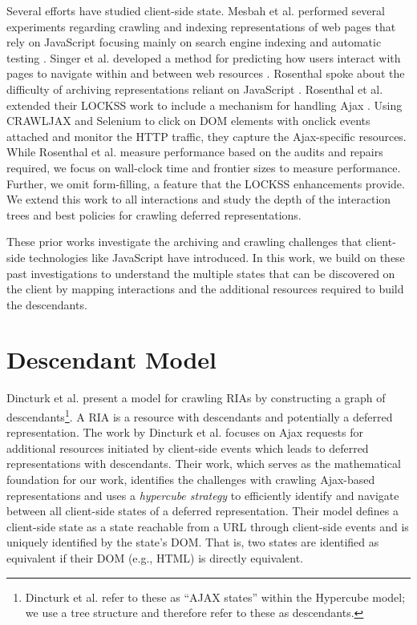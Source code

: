 \documentclass{sig-alternate}
\begin{document}
Several efforts have studied client-side state. Mesbah et al. performed several experiments regarding crawling and indexing representations of web pages that rely on JavaScript \cite{mesbahCrawling, mesbahInferState} focusing mainly on search engine indexing and automatic testing \cite{mesbahTesting, mesbah2}. Singer et al. developed a method for predicting how users interact with pages to navigate within and between web resources \cite{hyptrails}. Rosenthal spoke about the difficulty of archiving representations reliant on JavaScript \cite{iipc2013, futureWeb}. Rosenthal et al. extended their LOCKSS work to include a mechanism for handling Ajax \cite{dshrDlib}. Using CRAWLJAX and Selenium to click on DOM elements with onclick events attached and monitor the HTTP traffic, they capture the Ajax-specific resources. While Rosenthal et al. measure performance based on the audits and repairs required, we focus on wall-clock time and frontier sizes to measure performance. Further, we omit form-filling, a feature that the LOCKSS enhancements provide. We extend this work to all interactions and study the depth of the interaction trees and best policies for crawling deferred representations.

These prior works investigate the archiving and crawling challenges that client-side technologies like JavaScript have introduced. In this work, we build on these past investigations to understand the multiple states that can be discovered on the client by mapping interactions and the additional resources required to build the descendants.
\\
\section{Descendant Model}
\label{descs}
Dincturk et al. \cite{dincturkAjax} present a model for crawling RIAs by constructing a graph of descendants\footnote{Dincturk et al. refer to these as ``AJAX states'' within the Hypercube model; we use a tree structure and therefore refer to these as descendants.}. A RIA is a resource with descendants and potentially a deferred representation. The work by Dincturk et al. focuses on Ajax requests for additional resources initiated by client-side events which leads to deferred representations with descendants. Their work, which serves as the mathematical foundation for our work, identifies the challenges with crawling Ajax-based representations and uses a \emph{hypercube strategy} to efficiently identify and navigate between all client-side states of a deferred representation. Their model defines a client-side state as a state reachable from a URL through client-side events and is uniquely identified by the state's DOM. That is, two states are identified as equivalent if their DOM (e.g., HTML) is directly equivalent.
\end{document}

